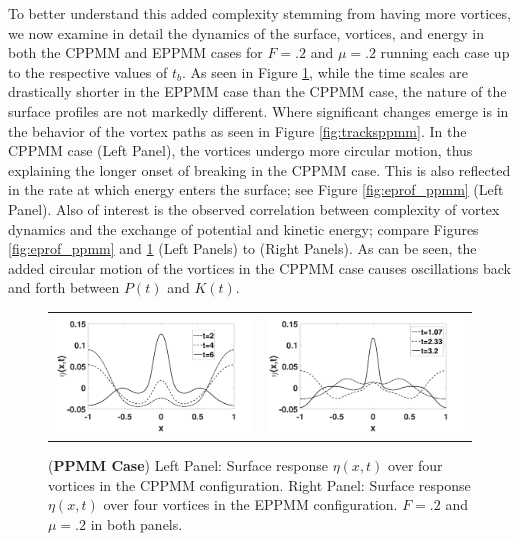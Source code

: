 \documentclass[a4paper,11pt]{article}
\begin{document}
To better understand this added complexity stemming from having more vortices, we now examine in detail the dynamics of the surface, vortices, and energy in both the CPPMM and EPPMM cases for $F=.2$ and $\mu=.2$ running each case up to the respective values of $t_{b}$.  As seen in Figure \ref{fig:surfrepppmm}, while the time scales are drastically shorter in the EPPMM case than the CPPMM case, the nature of the surface profiles are not markedly different.  Where significant changes emerge is in the behavior of the vortex paths as seen in Figure \ref{fig:tracksppmm}.  In the CPPMM case (Left Panel), the vortices undergo more circular motion, thus explaining the longer onset of breaking in the CPPMM case.  This is also reflected in the rate at which energy enters the surface; see Figure \ref{fig:eprof_ppmm} (Left Panel).   Also of interest is the observed correlation between complexity of vortex dynamics and the exchange of potential and kinetic energy; compare Figures \ref{fig:eprof_ppmm} and \ref{fig:surfrepppmm} (Left Panels) to (Right Panels).  As can be seen, the added circular motion of the vortices in the CPPMM case causes oscillations back and forth between $P(t)$ and $K(t)$.
%
\begin{figure}[!h]
\centering
\begin{tabular}{cc}
\includegraphics[width=.5\textwidth]{surf_resp_mu_pt2_F_pt2_ppmm} & 
\includegraphics[width=.5\textwidth]{surf_resp_mu_pt2_F_pt2_ppmm_sym}
\end{tabular}
\caption{\small ({\bf PPMM Case}) Left Panel: Surface response $\eta(x,t)$ over four vortices in the CPPMM configuration. Right Panel: Surface response $\eta(x,t)$ over four vortices in the EPPMM configuration.  $F=.2$ and $\mu=.2$ in both panels.}
\label{fig:surfrepppmm}
\end{figure}
\end{document}
